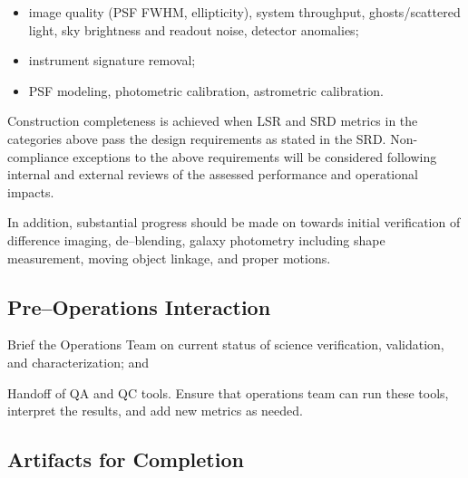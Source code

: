\begin{itemize}

	\item image quality (PSF FWHM, ellipticity), system throughput, ghosts/scattered light, sky brightness and readout noise, detector anomalies;
	\item instrument signature removal;
	\item PSF modeling, photometric calibration, astrometric calibration.
	
\end{itemize}

Construction completeness is achieved when LSR and SRD metrics in the categories above pass the design requirements as stated in the SRD. Non-compliance exceptions to the above requirements will be considered following internal and external reviews of the assessed performance and operational impacts.

In addition, substantial progress should be made on towards initial verification of difference imaging, de--blending, galaxy photometry including shape measurement, moving object linkage, and proper motions.

\subsection{Pre--Operations Interaction}

Brief the Operations Team on current status of science verification, validation, and characterization; and

Handoff of QA and QC tools. Ensure that operations team can run these tools, interpret the results, and add new metrics as needed.

\subsection{Artifacts for Completion}

